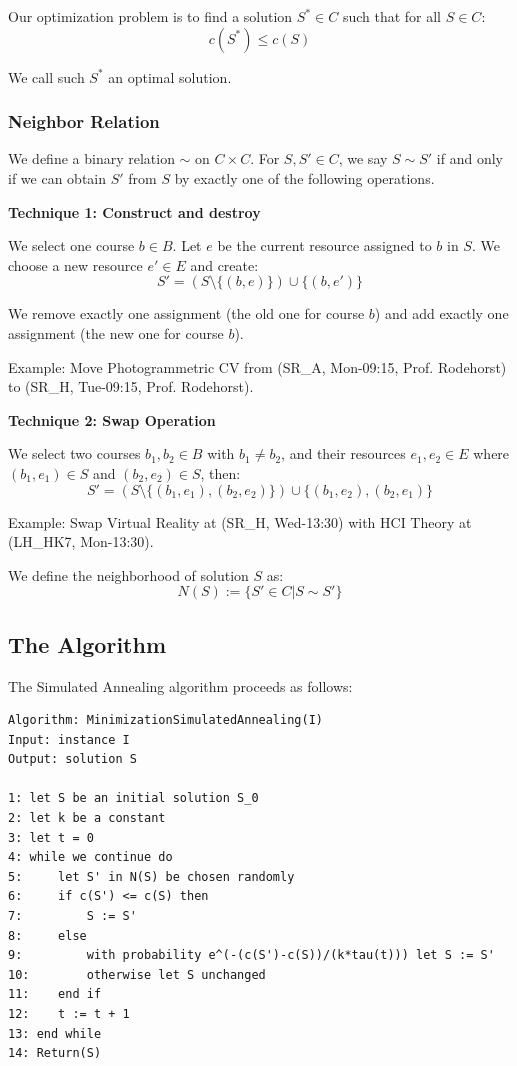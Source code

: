 \documentclass{article}
\begin{document}
Our optimization problem is to find a solution $S^* \in C$ such that for all $S \in C$:
$$c(S^*) \leq c(S)$$

We call such $S^*$ an optimal solution.

\subsubsection{Neighbor Relation}

We define a binary relation $\sim$ on $C \times C$. For $S, S' \in C$, we say $S \sim S'$ if and only if we can obtain $S'$ from $S$ by exactly one of the following operations.

\textbf{Technique 1: Construct and destroy}

We select one course $b \in B$. Let $e$ be the current resource assigned to $b$ in $S$. We choose a new resource $e' \in E$ and create:
$$S' = (S \setminus \{(b,e)\}) \cup \{(b,e')\}$$

We remove exactly one assignment (the old one for course $b$) and add exactly one assignment (the new one for course $b$).

Example: Move Photogrammetric CV from (SR\_A, Mon-09:15, Prof. Rodehorst) to (SR\_H, Tue-09:15, Prof. Rodehorst).

\textbf{Technique 2: Swap Operation}

We select two courses $b_1, b_2 \in B$ with $b_1 \neq b_2$, and their resources $e_1, e_2 \in E$ where $(b_1,e_1) \in S$ and $(b_2,e_2) \in S$, then:
$$S' = (S \setminus \{(b_1,e_1), (b_2,e_2)\}) \cup \{(b_1,e_2), (b_2,e_1)\}$$

Example: Swap Virtual Reality at (SR\_H, Wed-13:30) with HCI Theory at (LH\_HK7, Mon-13:30).

We define the neighborhood of solution $S$ as:
$$N(S) := \{S' \in C | S \sim S'\}$$

\subsection{The Algorithm}

The Simulated Annealing algorithm proceeds as follows:

\begin{verbatim}
Algorithm: MinimizationSimulatedAnnealing(I)
Input: instance I
Output: solution S

1: let S be an initial solution S_0
2: let k be a constant
3: let t = 0
4: while we continue do
5:     let S' in N(S) be chosen randomly
6:     if c(S') <= c(S) then
7:         S := S'
8:     else
9:         with probability e^(-(c(S')-c(S))/(k*tau(t))) let S := S'
10:        otherwise let S unchanged
11:    end if
12:    t := t + 1
13: end while
14: Return(S)
\end{verbatim}
\end{document}
